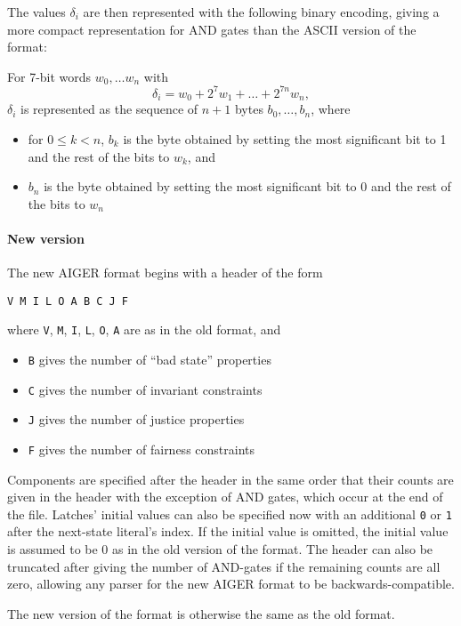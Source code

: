 \documentclass[12pt,a4paper,twoside,openright]{report}
\begin{document}
{{The values $\delta_i$ are then represented with the following binary
encoding, giving a more compact representation for AND gates than
the ASCII version of the format:

For 7-bit words $w_0, \ldots w_n$ with
$$\delta_i = w_0 + 2^7w_1 + \ldots + 2^{7n}w_n,$$
$\delta_i$ is represented as the sequence of $n + 1$ bytes
$b_0, \ldots, b_n$, where
\begin{itemize}
\item for $0 \leq k < n$, $b_k$ is the byte obtained by setting the most
significant bit to 1 and the rest of the bits to $w_k$, and
\item $b_n$ is the byte obtained by setting the most
significant bit to 0 and the rest of the bits to $w_n$
\end{itemize}}


\paragraph{New version} {
The new AIGER format begins with a header of the form
\begin{verbatim}
V M I L O A B C J F
\end{verbatim}
where \verb,V,, \verb,M,, \verb,I,, \verb,L,, \verb,O,, \verb,A, are as
in the old format, and
\begin{itemize}
\item \verb,B, gives the number of ``bad state'' properties
\item \verb,C, gives the number of invariant constraints
\item \verb,J, gives the number of justice properties
\item \verb,F, gives the number of fairness constraints
\end{itemize}

Components are specified after the header in the same order that their
counts are given in the header with the exception of AND gates, which
occur at the end of the file. Latches' initial values can also be specified
now with an additional \verb,0, or \verb,1, after the next-state literal's
index. If the initial value is omitted, the initial value is assumed to be
0 as in the old version of the format. The header can also be truncated
after giving the number of AND-gates if the remaining counts are all
zero, allowing any parser for the new AIGER format to be
backwards-compatible.

The new version of the format is otherwise
the same as the old format.}

}
\end{document}
